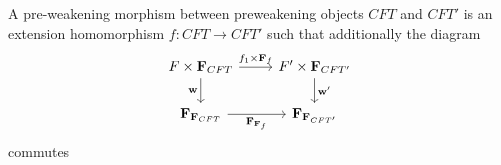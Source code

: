 \begin{comment}
\begin{align*}
w_0 & : F\times F\to F\times_{e_0,c} F\\
w_1 & : F\times(F\times_{e_0,c} F) \to F\times_{e_0,c \circ \pi_2^{e_0,c}} (F\times_{e_0,c}F)\\
w_2 & : F\times(F\times_{e_0,t\circ c} T) \to F\times_{e_0,c}(F\times_{e_0,t\circ c} T)
\end{align*}
for which the following diagrams commute:
\begin{equation*}
\begin{tikzcd}
F\times F \ar{r}{w_0} \ar{dr}[swap]{\pi_1} & F\times_{e_0,c}F \ar{d}{\pi_2^{e_0,c}}\\
& F
\end{tikzcd}
\end{equation*}
\begin{equation*}
\begin{tikzcd}
F\times(F\times_{e_0,c} F) 
  \ar{d}[swap]{\catid{F}\times \pi_2^{e_0,c}}
  \ar{r}{w_1}
  &
F\times_{e_0,c\circ \pi_2^{e_0,c}} (F\times_{e_0,c}F)
  \ar{d}{e_0^\ast(\pi_2^{e_0,c})}
  \\
F\times F
  \ar{r}[swap]{w_0}
  &
F\times_{e_0,c} F
\end{tikzcd}
\end{equation*}
\begin{equation*}
\begin{tikzcd}
F\times(F\times_{e_0,t\circ c} T)
  \ar{r}{w_2}
  \ar{d}[swap]{\catid{F}\times e_0^\ast(t)}
  &
F\times_{e_0,c}(F\times_{e_0,t\circ c} T)
  \ar{d}{e_0^\ast(e_0^\ast(t))}
  \\
F\times(F\times_{e_0,c} F)
  \ar{r}[swap]{w_1}
  &
F\times_{e_0,c\circ \pi_2^{e_0,c}} (F\times_{e_0,c}F)
\end{tikzcd}
\end{equation*}
\end{comment}

\begin{defn}
A pre-weakening morphism between preweakening objects $CFT$ and $CFT'$ is an
extension homomorphism $f:CFT\to CFT'$ such that additionally the diagram
\begin{equation*}
\begin{tikzcd}
F\times \mathbf{F}_{CFT}
  \ar{d}[swap]{\mathbf{w}}
  \ar{r}{f_1\times\mathbf{F}_f}
  &
F'\times\mathbf{F}_{CFT'}
  \ar{d}{\mathbf{w'}}
  \\
\mathbf{F}_{\mathbf{F}_{CFT}}
  \ar{r}[swap]{\mathbf{F}_{\mathbf{F}_f}}
  &
\mathbf{F}_{\mathbf{F}_{CFT'}}
\end{tikzcd}
\end{equation*}
commutes
\end{defn}
